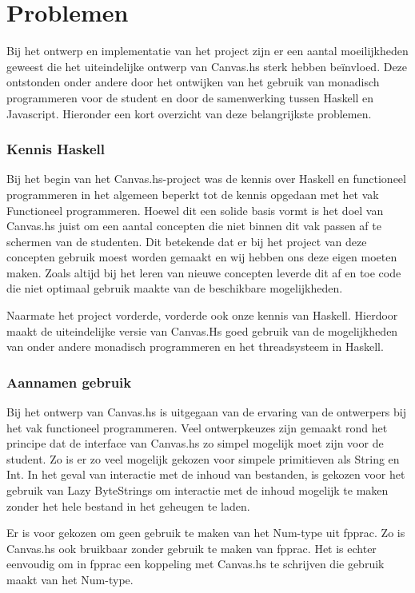 \section{Problemen}

Bij het ontwerp en implementatie van het project zijn er een aantal moeilijkheden geweest die het uiteindelijke ontwerp van Canvas.hs sterk hebben beïnvloed. Deze ontstonden onder andere door het ontwijken van het gebruik van monadisch programmeren voor de student en door de samenwerking tussen Haskell en Javascript. Hieronder een kort overzicht van deze belangrijkste problemen.

\subsubsection{Kennis Haskell}
Bij het begin van het Canvas.hs-project was de kennis over Haskell en functioneel programmeren in het algemeen beperkt tot de kennis opgedaan met het vak Functioneel programmeren. Hoewel dit een solide basis vormt is het doel van Canvas.hs juist om een aantal concepten die niet binnen dit vak passen af te schermen van de studenten. Dit betekende dat er bij het project van deze concepten gebruik moest worden gemaakt en wij hebben ons deze eigen moeten maken. Zoals altijd bij het leren van nieuwe concepten leverde dit af en toe code die niet optimaal gebruik maakte van de beschikbare mogelijkheden.

Naarmate het project vorderde, vorderde ook onze kennis van Haskell. Hierdoor maakt de uiteindelijke versie van Canvas.Hs goed gebruik van de mogelijkheden van onder andere monadisch programmeren en het threadsysteem in Haskell. 

\subsubsection{Aannamen gebruik}
Bij het ontwerp van Canvas.hs is uitgegaan van de ervaring van de ontwerpers bij het vak functioneel programmeren. Veel ontwerpkeuzes zijn gemaakt rond het principe dat de interface van Canvas.hs zo simpel mogelijk moet zijn voor de student. Zo is er zo veel mogelijk gekozen voor simpele primitieven als String en Int. In het geval van interactie met de inhoud van bestanden, is gekozen voor het gebruik van Lazy ByteStrings om interactie met de inhoud mogelijk te maken zonder het hele bestand in het geheugen te laden.

Er is voor gekozen om geen gebruik te maken van het Num-type uit fpprac. Zo is Canvas.hs ook bruikbaar zonder gebruik te maken van fpprac. Het is echter eenvoudig om in fpprac een koppeling met Canvas.hs te schrijven die gebruik maakt van het Num-type.

